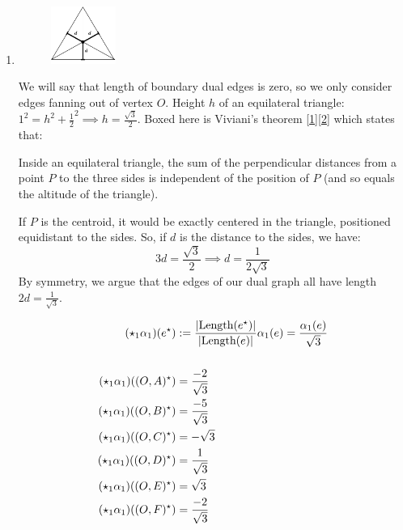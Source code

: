 \documentclass{article}
\newcommand\ifrac[2]{{\displaystyle\frac{#1}{#2}}}
\def\nt{\notag}
\def\hal{\frac{1}{2}}
\begin{document}
\begin{enumerate}[label=(\alph*)]
    \item 
    \begin{figure} %
        \centering
        \includegraphics[width=0.2\textwidth]{figs/dual_edge.pdf}
    \end{figure}
    We will say that length of boundary dual edges is zero, so we only consider edges fanning out of vertex $O$.
    Height $h$ of an equilateral triangle: $1^2 = h^2 + \hal^2 \implies h = \ifrac{\sqrt3}{2}$. 
    Boxed here is Viviani's theorem [\href{https://en.wikipedia.org/wiki/Viviani%27s_theorem}{1}][\href{https://www.google.com/url?sa=t&rct=j&q=&esrc=s&source=web&cd=&cad=rja&uact=8&ved=2ahUKEwjqvLnXps35AhXbGVkFHUDADcYQFnoECA0QAw&url=https%3A%2F%2Fwww.maa.org%2Fsites%2Fdefault%2Ffiles%2FChen-CMJ-2006.pdf&usg=AOvVaw0kXL5NnMvqD5_oh29f4N_H}{2}]
    which states that:
    \begin{mdframed}
    Inside an equilateral
    triangle, the sum of the perpendicular distances from a point $P$ to the three sides is independent
    of the position of $P$ (and so equals the altitude of the triangle).
    \end{mdframed}
    If $P$ is the centroid, it would be exactly centered in the triangle, positioned equidistant to the sides.
    So, if $d$ is the distance to the sides, we have: $$3d = \ifrac{\sqrt3}{2} \implies d = \frac{1}{2\sqrt3}$$
    By symmetry, we argue that the edges of our dual graph all have length $2d = \ifrac{1}{\sqrt3}$.

    \begin{align}
        (\star_1\alpha_1)(e^\star) &:= \frac{|\text{Length}(e^\star)|}{|\text{Length}(e)|}\alpha_1(e) = \frac{\alpha_1(e)}{\sqrt3}\nt\\\nt\\
        (\star_1\alpha_1)((O,A)^\star) &= \frac{-2}{\sqrt3} \nt\\
        (\star_1\alpha_1)((O,B)^\star) &= \frac{-5}{\sqrt3} \nt\\
        (\star_1\alpha_1)((O,C)^\star) &= -\sqrt3 \nt\\
        (\star_1\alpha_1)((O,D)^\star) &= \frac{1}{\sqrt3} \nt\\
        (\star_1\alpha_1)((O,E)^\star) &= \sqrt3 \nt\\
        (\star_1\alpha_1)((O,F)^\star) &= \frac{-2}{\sqrt3} \nt
    \end{align}


\end{enumerate}
\end{document}
